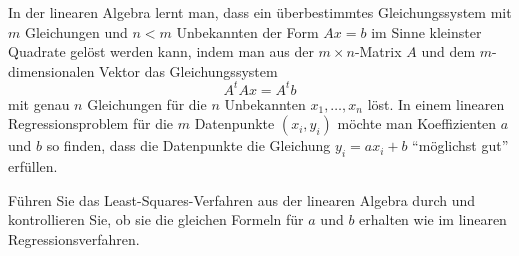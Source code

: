 In der linearen Algebra lernt man, dass ein überbestimmtes Gleichungssystem
mit $m$ Gleichungen und $n<m$ Unbekannten der Form $Ax=b$ im Sinne kleinster Quadrate
gelöst werden kann, indem man aus der $m\times n$-Matrix $A$ und dem 
$m$-dimensionalen Vektor das Gleichungssystem
\[
A^tA x= A^tb
\]
mit genau $n$ Gleichungen für die $n$ Unbekannten $x_1,\dots,x_n$ löst.
In einem linearen Regressionsproblem für die $m$ Datenpunkte $(x_i,y_i)$
möchte man Koeffizienten $a$ und $b$ so finden, dass die Datenpunkte
die Gleichung $y_i=ax_i+b$ ``möglichst gut'' erfüllen.

Führen Sie das Least-Squares-Verfahren aus der linearen Algebra durch und
kontrollieren Sie, ob sie die gleichen Formeln für $a$ und $b$ erhalten
wie im linearen Regressionsverfahren.


